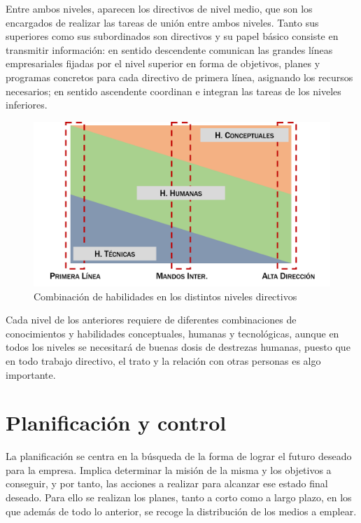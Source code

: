 \documentclass[
]{krantz}
\begin{document}
Entre ambos niveles, aparecen los directivos de nivel medio, que son los encargados de realizar las tareas de unión entre ambos niveles. Tanto sus superiores como sus subordinados son directivos y su papel básico consiste en transmitir información: en sentido descendente comunican las grandes líneas empresariales fijadas por el nivel superior en forma de objetivos, planes y programas concretos para cada directivo de primera línea, asignando los recursos necesarios; en sentido ascendente coordinan e integran las tareas de los niveles inferiores.

\begin{figure}

{\centering \includegraphics[width=0.85\linewidth]{images/20a-02} 

}

\caption{Combinación de habilidades en los distintos niveles directivos}\label{fig:20a-02}
\end{figure}

Cada nivel de los anteriores requiere de diferentes combinaciones de conocimientos y habilidades conceptuales, humanas y tecnológicas, aunque en todos los niveles se necesitará de buenas dosis de destrezas humanas, puesto que en todo trabajo directivo, el trato y la relación con otras personas es algo importante.

\hypertarget{planificaciuxf3n-y-control}{%
\chapter{Planificación y control}\label{planificaciuxf3n-y-control}}

La planificación se centra en la búsqueda de la forma de lograr el futuro deseado para la empresa. Implica determinar la misión de la misma y los objetivos a conseguir, y por tanto, las acciones a realizar para alcanzar ese estado final deseado. Para ello se realizan los planes, tanto a corto como a largo plazo, en los que además de todo lo anterior, se recoge la distribución de los medios a emplear.
\end{document}
